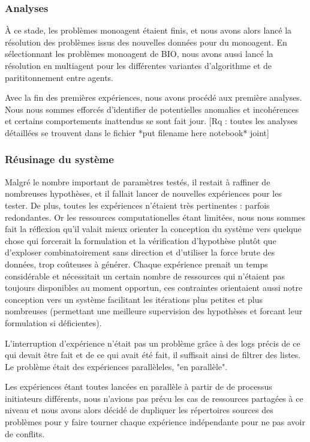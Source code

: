 \documentclass{article}
\begin{document}
\subsubsection{Analyses}
À ce stade, les problèmes monoagent étaient finis, et nous avons alors lancé la résolution des problèmes issus des nouvelles données pour du monoagent. En sélectionnant les problèmes monoagent de BIO, nous avons aussi lancé la résolution en multiagent pour les différentes variantes d'algorithme et de parititonnement entre agents.

Avec la fin des premières expériences, nous avons procédé aux première analyses.
Nous nous sommes efforcés d'identifier de potentielles anomalies et incohérences et certains comportements inattendus se sont fait jour.
[Rq : toutes les analyses détaillées se trouvent dans le fichier *put filename here notebook* joint]


\subsubsection{Réusinage du système}
Malgré le nombre important de paramètres testés, il restait à raffiner de nombreuses hypothèses, et il fallait lancer de nouvelles expériences pour les tester.
De plus, toutes les expériences n'étaient très pertinentes : parfois redondantes. 
Or les ressources computationelles étant limitées, nous nous sommes fait la réflexion qu'il valait mieux orienter la conception du système vers quelque chose qui forcerait la formulation et la vérification d'hypothèse plutôt que d'exploser combinatoirement sans direction et d'utiliser la force brute des données, trop coûteuses à générer. Chaque expérience prenait un temps considérable et nécessitait un certain nombre de ressources qui n'étaient pas toujours disponibles au moment opportun, ces contraintes orientaient aussi notre conception vers un système facilitant les itérations plus petites et plus nombreuses (permettant une meilleure supervision des hypothèses et forcant leur formulation si déficientes).


L'interruption d'expérience n'était pas un problème grâce à des logs précis de ce qui  devait être fait et de ce qui avait été fait, il suffisait ainsi de filtrer des listes. Le problème était des expériences parallèleles, "en parallèle".

Les expériences étant toutes lancées en parallèle à partir de de processus initiateurs différents, nous n'avions pas prévu les cas de ressources partagées à ce niveau et nous avons alors décidé de dupliquer les répertoires sources des problèmes pour y faire tourner chaque expérience indépendante pour ne pas avoir de conflits.
\end{document}
